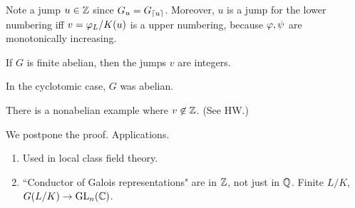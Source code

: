Note a jump $u\in \mathbb{Z}$ since $G_u=G_{\left\lceil {u}\right\rceil}$. Moreover, $u$ is a jump for the lower numbering iff $v=\varphi_L/K(u)$ is a upper numbering, because $\varphi,\psi$ are monotonically increasing.

\begin{thm}
If $G$ is finite abelian, then the jumps $v$ are integers.
\end{thm}
In the cyclotomic case, $G$ was abelian.
\begin{rem}
There is a nonabelian example where $v\not\in \mathbb{Z}$. (See HW.)
\end{rem}
We postpone the proof.
Applications.
\begin{enumerate}
\item
Used in local class field theory. 
\item
``Conductor of Galois representations" are in $\mathbb{Z}$, not just in $\mathbb{Q}$. Finite $L/K$, $G(L/K)\to \operatorname{GL}_n(\mathbb{C})$. %
\end{enumerate}